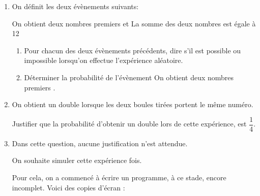\documentclass[10pt]{article}
\begin{document}
\begin{enumerate}
\item On définit les deux évènements suivants:

\og On obtient deux nombres premiers \fg{} et \og La somme des deux nombres est égale à 12 \fg
	\begin{enumerate}
		\item Pour chacun des deux évènements précédents, dire s'il est possible ou impossible lorsqu'on effectue l'expérience aléatoire.
		\item Déterminer la probabilité de l'évènement \og On obtient deux nombres premiers \fg.
	\end{enumerate}
\item On obtient un \og double \fg{} lorsque les deux boules tirées portent le même numéro. 

Justifier que la probabilité d'obtenir un \og double \fg{} lors de cette expérience, est $\dfrac{1}{4}$.
\item Dans cette question, aucune justification n'est attendue. 

On souhaite simuler cette expérience  fois.

Pour cela, on a commencé à écrire un programme, à ce stade, encore incomplet. Voici des copies d'écran :


\end{enumerate}
\end{document}
